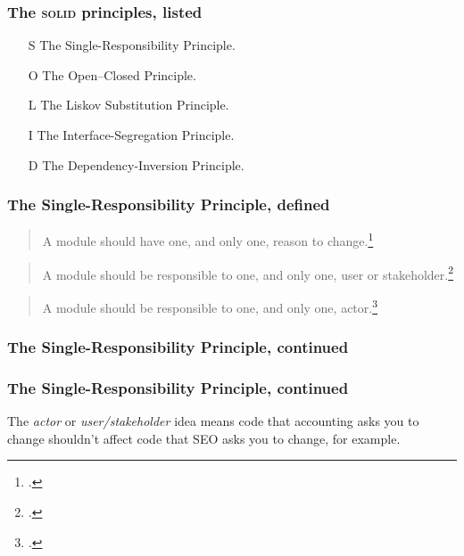 \documentclass[aspectratio=169]{beamer}
\begin{document}
\begin{frame}
  \frametitle{The \textsc{solid} principles, listed}

  \begin{itemize}
    \item[S] The Single-Responsibility Principle.
    \item[O] The Open--Closed Principle.
    \item[L] The Liskov Substitution Principle.
    \item[I] The Interface-Segregation Principle.
    \item[D] The Dependency-Inversion Principle.
  \end{itemize}
\end{frame}


\begin{frame}
  \frametitle{The Single-Responsibility Principle, defined}

  \begin{quote}
    A module should have one, and only one, reason to
    change.\footnote{\cite[p.~62]{clean-arch}.}
  \end{quote}

  \begin{quote}
    A module should be responsible to one, and only one, user or
    stakeholder.\footnote{\cite[p.~62]{clean-arch}.}
  \end{quote}

  \begin{quote}
    A module should be responsible to one, and only one,
    actor.\footnote{\cite[p.~62]{clean-arch}.}
  \end{quote}
\end{frame}

\begin{frame}
  \frametitle{The Single-Responsibility Principle, continued}

\end{frame}


\begin{frame}
  \frametitle{The Single-Responsibility Principle, continued}

  The \emph{actor} or \emph{user/stakeholder} idea means code that accounting
  asks you to change shouldn't affect code that SEO asks you to change, for
  example.
\end{frame}
\end{document}
